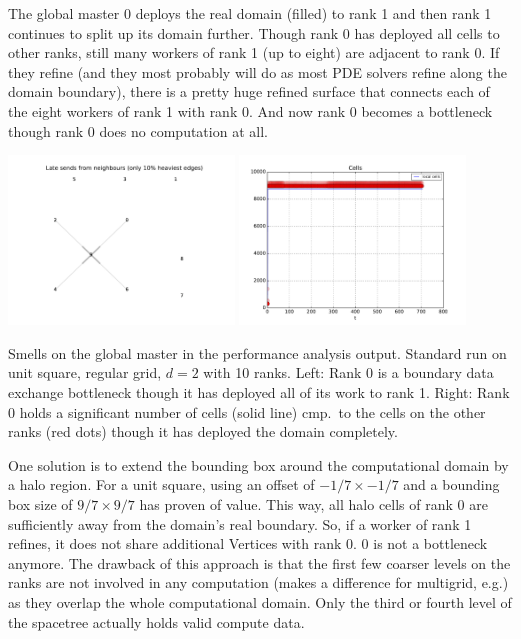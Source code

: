 The global master 0 deploys the real domain (filled) to rank 1 and then rank 1
continues to split up its domain further.
Though rank 0 has deployed all cells to other ranks, still many workers of rank
1 (up to eight) are adjacent to rank 0. 
If they refine (and they most probably will do as most PDE solvers refine along
the domain boundary), there is a pretty huge refined surface that connects each
of the eight workers of rank 1 with rank 0. 
And now rank 0 becomes a bottleneck though rank 0 does no computation at all.

\begin{center}
  \includegraphics[width=0.45\textwidth]{62_quick-tuning/boundary-data-exchange.pdf}
  \includegraphics[width=0.45\textwidth]{62_quick-tuning/local-cells-rank-0.pdf}
  \\
\end{center}
  {
  \footnotesize
  Smells on the global master in the performance analysis output.
  Standard run on unit square, regular grid, $d=2$ with 10 ranks. 
  Left: Rank 0 is a boundary data exchange bottleneck though it has deployed all
  of its work to rank 1.
  Right:
  Rank 0 holds a significant number of cells (solid line) cmp.~to the cells on
  the other ranks (red dots) though it has deployed the domain completely.
  \vspace{0.8cm}
  
  }

One solution is to extend the bounding box around the computational domain by a
halo region.
For a unit square, using an offset of $-1/7 \times -1/7$ and a bounding box
size of $9/7 \times  9/7$ has proven of value. 
This way, all halo cells of rank 0 are sufficiently away from the domain's real
boundary. 
So, if a worker of rank 1 refines, it does not share additional Vertices with rank 0. 0 is not a bottleneck anymore.
The drawback of this approach is that the first few coarser levels on the ranks
are not involved in any computation (makes a difference for multigrid, e.g.) as
they overlap the whole computational domain. 
Only the third or fourth level of the spacetree actually holds valid compute
data.

